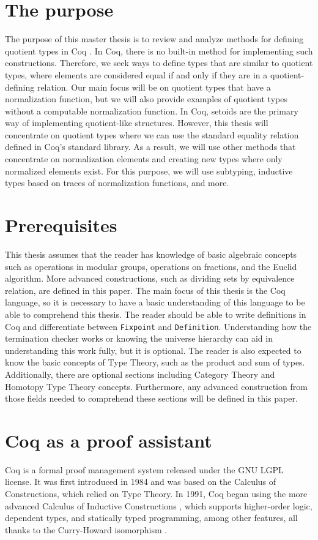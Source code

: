 \section{The purpose}
The purpose of this master thesis is to review and analyze methods for defining quotient types in Coq \cite{PragmaticQT}. In Coq, there is no built-in method for implementing such constructions. Therefore, we seek ways to define types that are similar to quotient types, where elements are considered equal if and only if they are in a quotient-defining relation. Our main focus will be on quotient types that have a normalization function, but we will also provide examples of quotient types without a computable normalization function. In Coq, setoids \cite{SetoidsInTT} are the primary way of implementing quotient-like structures. However, this thesis will concentrate on quotient types where we can use the standard equality relation defined in Coq's standard library. As a result, we will use other methods that concentrate on normalization elements and creating new types where only normalized elements exist. For this purpose, we will use subtyping, inductive types based on traces of normalization functions, and more.

\section{Prerequisites}
This thesis assumes that the reader has knowledge of basic algebraic concepts such as operations in modular groups, operations on fractions, and the Euclid algorithm. More advanced constructions, such as dividing sets by equivalence relation, are defined in this paper. The main focus of this thesis is the Coq language, so it is necessary to have a basic understanding of this language to be able to comprehend this thesis. The reader should be able to write definitions in Coq and differentiate between \texttt{Fixpoint} and \texttt{Definition}. Understanding how the termination checker works or knowing the universe hierarchy can aid in understanding this work fully, but it is optional. The reader is also expected to know the basic concepts of Type Theory, such as the product and sum of types. Additionally, there are optional sections including Category Theory and Homotopy Type Theory concepts. Furthermore, any advanced construction from those fields needed to comprehend these sections will be defined in this paper.

\section{Coq as a proof assistant}
Coq is a formal proof management system released under the GNU LGPL license. It was first introduced in 1984 and was based on the Calculus of Constructions, which relied on Type Theory. In 1991, Coq began using the more advanced Calculus of Inductive Constructions \cite{cic} \cite{cicOrigins}, which supports higher-order logic, dependent types, and statically typed programming, among other features, all thanks to the Curry-Howard isomorphism \cite{curry-howard}.

